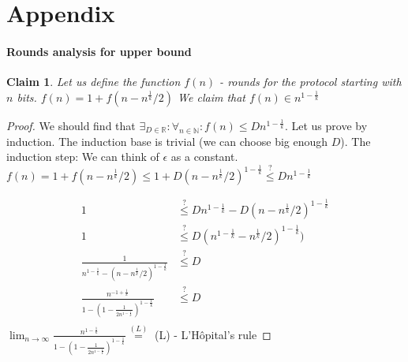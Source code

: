 \documentclass{article}
\theoremstyle{plain}
\newtheorem{claim}{Claim}
\begin{document}
\section{Appendix}
\paragraph{Rounds analysis for upper bound}
\begin{claim}
    Let us define the function $f(n)$ - rounds for the protocol starting with $n$ bits.
    $f(n) = 1 + f(n - n^{\frac{1}{k}}/2)$ \newline
    We claim that $f(n) \in n^{1-\frac{1}{k}}$
\end{claim}
\begin{proof}
We should find that $ \exists_{D\in\mathbb{R}} : \forall_{n \in \mathbb{N}} : f(n) \leq Dn^{1-\frac{1}{k}}$. Let us prove by induction. The induction base is trivial (we can choose big enough $D$). The induction step: \newline
We can think of $\epsilon$ as a constant. \newline
$f(n) = 1 + f(n - n^{\frac{1}{k}}/2) \leq 1 + D(n - n^{\frac{1}{k}}/2)^{1-\frac{1}{k}} \overset{?}{\leq} Dn^{1-\frac{1}{k}}$ \newline

\begin{align*}
  1 &\overset{?}{\leq} Dn^{1-\frac{1}{k}} -  D(n - n^{\frac{1}{k}}/2)^{1-\frac{1}{k}}\\
  1 &\overset{?}{\leq} D(n^{1-\frac{1}{k}} -  n^{\frac{1}{k}}/2)^{1-\frac{1}{k}})\\
  \frac{1}{n^{1-\frac{1}{k}} -  (n - n^{\frac{1}{k}}/2)^{1-\frac{1}{k}}} & \overset{?}{\leq} D \\
  \frac{n^{-1+\frac{1}{k}}}{1 -  (1 - \frac{1}{2n^{1 - \frac{1}{k}}})^{1-\frac{1}{k}}} & \overset{?}{\leq} D \\  
\end{align*}
$\lim_{n \rightarrow \infty} \frac{n^{1-\frac{1}{k}}}{1 -  (1 - \frac{1}{2n^{1 - \frac{1}{k}}})^{1-\frac{1}{k}}} \overset{(L)}{=} $
\newline
(L) - L'Hôpital's rule
\end{proof}
\end{document}
